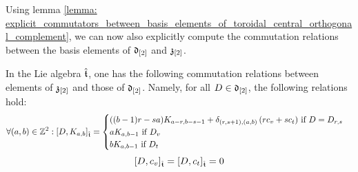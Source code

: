         Using lemma \ref{lemma: explicit_commutators_between_basis_elements_of_toroidal_central_orthogonal_complement}, we can now also explicitly compute the commutation relations between the basis elements of $\mathfrak{d}_{[2]}$ and $\mathfrak{z}_{[2]}$.
        \begin{lemma} \label{lemma: explicit_commutators_between_central_basis_elements_and_derivations}
            In the Lie algebra $\hat{\mathfrak{t}}$, one has the following commutation relations between elements of $\mathfrak{z}_{[2]}$ and those of $\mathfrak{d}_{[2]}$. Namely, for all $D \in \mathfrak{d}_{[2]}$, the following relations hold:
                $$
                    \forall (a, b) \in \mathbb{Z}^2: [D, K_{a, b}]_{\hat{\mathfrak{t}}} =
                    \begin{cases}
                        \text{$((b - 1)r - sa) K_{a - r, b - s - 1} + \delta_{(r, s + 1), (a, b)} \left( r c_v + s c_t \right)$ if $D = D_{r, s}$}
                        \\
                        \text{$a K_{a, b - 1}$ if $D_v$}
                        \\
                        \text{$b K_{a, b - 1}$ if $D_t$}
                    \end{cases}
                $$
                $$[D, c_v]_{\hat{\mathfrak{t}}} = [D, c_t]_{\hat{\mathfrak{t}}} = 0$$
        \end{lemma}
